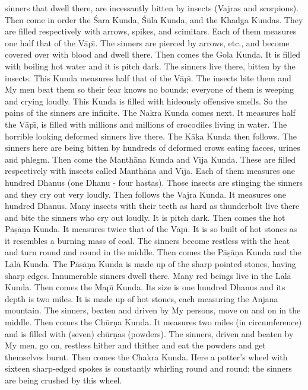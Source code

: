 sinners that dwell there, are incessantly bitten by insects (Vajras and scorpions). Then come in order the \'Sara Kunda, \'S\=ula Kunda, and the Khadga Kundas. They are filled respectively with arrows, spikes, and scimitars. Each of them measures one half that of the V\=ap\={\i}. The sinners are pierced by arrows, etc., and become covered over with blood and dwell there. Then comes the Gola Kunda. It is filled with boiling hot water and it is pitch dark. The sinners live there, bitten by the insects. This Kunda measures half that of the V\=ap\={\i}. The insects bite them and My men beat them so their fear knows no bounds; everyone of them is weeping and crying loudly. This Kunda is filled with hideously offensive smells. So the pains of the sinners are infinite. The Nakra Kunda comes next. It measures half the V\=ap\={\i}, is filled with millions and millions of crocodiles living in water. The horrible looking deformed sinners live there. The K\=aka Kunda then follows. The sinners here are being bitten by hundreds of deformed crows eating faeces, urines and phlegm. Then come the Manth\=ana Kunda and V\={\i}ja Kunda. These are filled respectively with insects called Manth\=ana and V\={\i}ja. Each of them measures one hundred Dhanus (one Dhanu - four hastas). Those insects are stinging the sinners and they cry out very loudly. Then follows the Vajra Kunda. It measures one hundred Dhanus. Many insects with their teeth as hard as thunderbolt live there and bite the sinners who cry out loudly. It is pitch dark. Then comes the hot P\=a\d{s}\=a\d{n}a Kunda. It measures twice that of the V\=ap\={\i}. It is so built of hot stones as it resembles a burning mass of coal. The sinners become restless with the heat and turn round and round in the middle. Then comes the P\=a\d{s}\=a\d{n}a Kunda and the L\=al\=a Kunda. The P\=a\d{s}\=a\d{n}a Kunda is made up of the sharp pointed stones, having sharp edges. Innumerable sinners dwell there. Many red beings live in the L\=al\=a Kunda. Then comes the Map\={\i} Kunda. Its size is one hundred Dhanus and its depth is two miles. It is made up of hot stones, each measuring the Anjana mountain. The sinners, beaten and driven by My persons, move on and on in the middle. Then comes the Ch\=ur\d{n}a Kunda. It measures two miles (in circumference) and is filled with (seven) ch\=ur\d{n}as (powders). The sinners, driven and beaten by My men, go on, restless hither and thither and eat the powders and get themselves burnt. Then comes the Chakra Kunda. Here a potter's wheel with sixteen sharp-edged spokes is constantly whirling round and round; the sinners are being crushed by this wheel.

